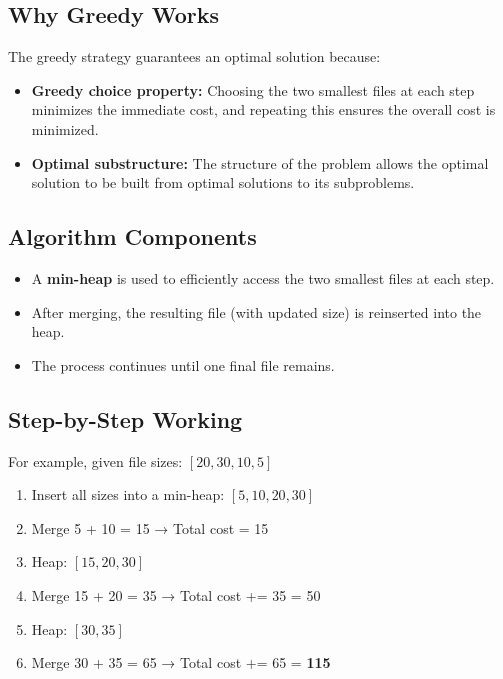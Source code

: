 \documentclass[14pt]{extarticle}
\begin{document}
\subsection*{Why Greedy Works}
The greedy strategy guarantees an optimal solution because:

\begin{itemize}
    \item \textbf{Greedy choice property:} Choosing the two smallest files at each step minimizes the immediate cost, and repeating this ensures the overall cost is minimized.
    \item \textbf{Optimal substructure:} The structure of the problem allows the optimal solution to be built from optimal solutions to its subproblems.
\end{itemize}

\newpage
\subsection*{Algorithm Components}

\begin{itemize}
    \item A \textbf{min-heap} is used to efficiently access the two smallest files at each step.
    \item After merging, the resulting file (with updated size) is reinserted into the heap.
    \item The process continues until one final file remains.
\end{itemize}

\subsection*{Step-by-Step Working}

For example, given file sizes: $[20, 30, 10, 5]$

\begin{enumerate}
    \item Insert all sizes into a min-heap: $[5, 10, 20, 30]$
    \item Merge 5 + 10 = 15 → Total cost = 15
    \item Heap: $[15, 20, 30]$
    \item Merge 15 + 20 = 35 → Total cost += 35 = 50
    \item Heap: $[30, 35]$
    \item Merge 30 + 35 = 65 → Total cost += 65 = \textbf{115}
\end{enumerate}
\end{document}
